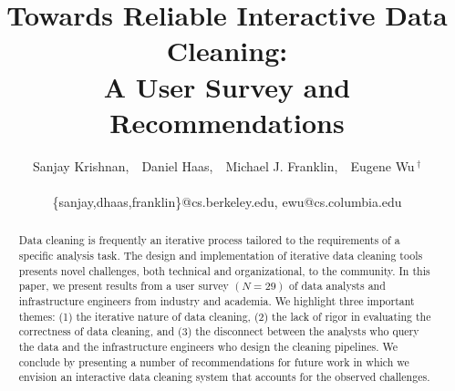 \documentclass{sig-alternate-05-2015}
\author{Sanjay Krishnan,~~Daniel Haas,~~Michael J. Franklin,~~Eugene Wu{$\,^\dag$} \\
\vspace{.2em}\affaddr{AMPLab, UC Berkeley ~~~~ $^\dag$Columbia University} \\
\vspace{.1em}\{sanjay,dhaas,franklin\}@cs.berkeley.edu, ewu@cs.columbia.edu
}
\begin{document}


\newtheorem{theorem}{Theorem}
\newtheorem{example}{Example}
\newtheorem{definition}{Definition}
\newtheorem{problem}{Problem}
\newtheorem{property}{Property}
\newtheorem{proposition}{Proposition}
\newtheorem{lemma}{Lemma}
\newtheorem{corollary}{Corollary}



\title{Towards Reliable Interactive Data Cleaning: \\ A User Survey and Recommendations}


\maketitle

\begin{abstract}
Data cleaning is frequently an iterative process tailored to the requirements of a specific analysis task.
The design and implementation of iterative data cleaning tools presents novel challenges, both technical and organizational, to the community.
In this paper, we present results from a user survey $(N=29)$ of data analysts and infrastructure engineers from industry and academia. We highlight three important themes: (1) the iterative nature of data cleaning, (2) the lack of rigor in evaluating the correctness of data cleaning, and (3) the disconnect between the analysts who query the data and the infrastructure engineers who design the cleaning pipelines.
We conclude by presenting a number of recommendations for future work in which we envision an interactive data cleaning system that accounts for the observed challenges.
\end{abstract}







\fontsize{9}{9.5} \selectfont

 
\clearpage
\normalsize \selectfont
\end{document}
